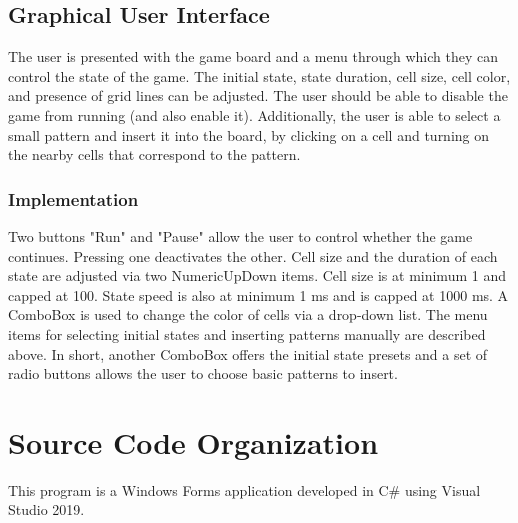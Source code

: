 \documentclass[12pt, letterpaper]{article}
\begin{document}
\subsection*{Graphical User Interface}
The user is presented with the game board and a menu through which they can control the state of the game. The initial state, state duration, cell size, cell color, and presence of grid lines can be adjusted. The user should be able to disable the game from running (and also enable it). Additionally, the user is able to select a small pattern and insert it into the board, by clicking on a cell and turning on the nearby cells that correspond to the pattern.
\subsubsection*{Implementation}
Two buttons "Run" and "Pause" allow the user to control whether the game continues. Pressing one deactivates the other. Cell size and the duration of each state are adjusted via two NumericUpDown items. Cell size is at minimum 1 and capped at 100. State speed is also at minimum 1 ms and is capped at 1000 ms. A ComboBox is used to change the color of cells via a drop-down list. The menu items for selecting initial states and inserting patterns manually are described above. In short, another ComboBox offers the initial state presets and a set of radio buttons allows the user to choose basic patterns to insert.



\newpage

\newpage
\section*{Source Code Organization}
This program is a Windows Forms application developed in C\# using Visual Studio 2019. 
\end{document}
